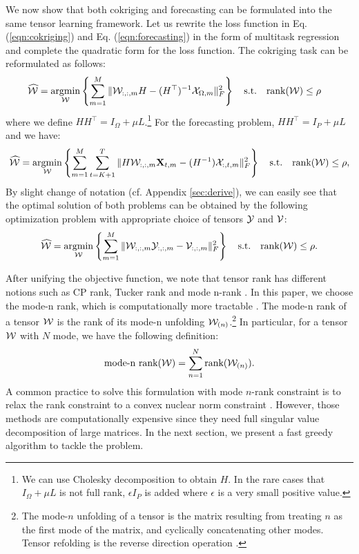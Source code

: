 We now show that both cokriging and forecasting can be formulated into the same tensor learning framework. Let us rewrite the loss function in Eq. (\ref{eqn:cokriging}) and Eq. (\ref{eqn:forecasting}) in the form of multitask regression and complete the quadratic form for the loss function. The cokriging task can be reformulated as follows:
\begin{align}
\widehat{{\mathcal W}} = \operatorname*{argmin}_{{\mathcal W}}& \left\{\sum_{m=1}^{M} \|{\mathcal W}_{:, :, m}H - (H^{\top})^{-1}{\mathcal X}_{\Omega, m} \|^2_F\right\} \quad
\mathrm{s.t.} \quad \text{rank}({\mathcal W}) \leq \rho  \label{eqn:cokriging_reformulate}
\end{align}
\noindent where we define $HH^{\top} = I_{\Omega}+\mu L$.\footnote{We can use Cholesky decomposition to obtain $H$. In the rare cases that $I_{\Omega}+\mu L$ is not full rank, $\epsilon I_{P}$ is added where $\epsilon$ is a very small positive value.} For the forecasting problem, $HH^{\top} = I_{P}+\mu L$ and we have:
\begin{align}
\widehat{{\mathcal W}} = \operatorname*{argmin}_{{\mathcal W}} \left\{\sum_{m=1}^{M}\sum_{t=K+1}^{T} \|H{\mathcal W}_{:, :, m}\mathbf{X}_{t, m} - (H^{-1}){\mathcal X}_{:, t, m} \|^2_F\right\}
\quad \mathrm{s.t.}  \quad\text{rank}({\mathcal W}) \leq \rho,  \label{eqn:forecasting_reformulate}
\end{align}
By slight change of notation (cf. Appendix \ref{sec:derive}), we can easily see that the optimal solution of both problems can be obtained by the following optimization problem with appropriate choice of tensors ${\mathcal Y}$ and ${\mathcal V}$:
\begin{equation}
\widehat{{\mathcal W}} = \operatorname*{argmin}_{{\mathcal W}} \left\{\sum_{m=1}^{M} \|{\mathcal W}_{:, :, m}{\mathcal Y}_{:, :, m} - {\mathcal V}_{:, :, m} \|^2_F\right\} \quad
\mathrm{s.t.} \quad\text{rank}({\mathcal W}) \leq \rho.
\label{eq:greedyUnified}
\end{equation}

After unifying the objective function, we note that tensor rank has different notions such as CP rank, Tucker rank and mode n-rank \cite{kolda2009tensor,gandy2011tensor}. In this paper,  we choose the mode-n rank, which is computationally more tractable \cite{gandy2011tensor,tomioka2010estimation}. The mode-n rank of a tensor ${\mathcal W}$ is the rank of its mode-n unfolding ${\mathcal W}_{(n)}$.\footnote{The mode-$n$ unfolding of a tensor is the matrix resulting from treating $n$ as the first mode of the matrix, and cyclically concatenating other modes. Tensor refolding is the reverse direction operation \cite{kolda2009tensor}.} In particular, for a tensor ${\mathcal W}$ with $N$ mode, we have the following definition:
\begin{equation}
\text{mode-n rank}({\mathcal W}) = \sum\limits_{n=1}^N \text{rank}({\mathcal W}_{(n)}).
\end{equation}
 A common practice to solve this formulation with mode $n$-rank constraint  is to relax the rank constraint to a convex nuclear norm constraint \cite{gandy2011tensor,tomioka2010estimation}. However, those methods are  computationally expensive since they need full singular value decomposition of large matrices. In the next section, we present a fast greedy algorithm to tackle the problem.
